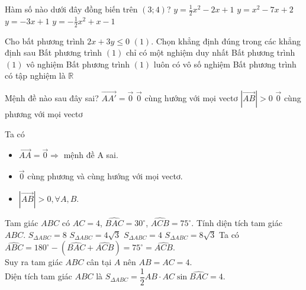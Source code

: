 \begin{ex}%
Hàm số nào dưới đây đồng biến trên $(3; 4)$?
\choice
{\True $y=\frac{1}{2} x^2-2 x+1$}
{$y=x^2-7 x+2$}
{$y=-3 x+1$}
{$y=-\frac{1}{2} x^2+x-1$}
\end{ex}

\begin{ex}%
Cho bất phương trình $2x+3y \le 0$ $(1)$. Chọn khẳng định đúng trong các khẳng định sau
\choice
{Bất phương trình $(1)$ chỉ có một nghiệm duy nhất}
{Bất phương trình $(1)$ vô nghiệm}
{\True Bất phương trình $(1)$ luôn có vô số nghiệm}
{Bất phương trình  có tập nghiệm là $\mathbb{R}$}
\end{ex}

\begin{ex}%
Mệnh đề nào sau đây sai?
\choice
{\True $\vec{AA'}=\vec{0}$}
{$\vec{0}$ cùng hướng với mọi vectơ}
{$\left| \vec{AB} \right|>0$}
{$\vec{0}$ cùng phương với mọi vectơ}
\loigiai
{Ta có
\begin{itemize}
\item $\vec{AA}=\vec{0}\Rightarrow$ mệnh đề A sai.
\item $\vec{0}$ cùng phương và cùng hướng với mọi vectơ.
\item $\left| \vec{AB} \right|>0,\forall A,B$.
\end{itemize}
}
\end{ex}

\begin{ex}%
Tam giác $ ABC$ có $ AC=4$, $\widehat{BAC}=30^\circ$, $\widehat{ACB}=75^\circ $. Tính diện tích tam giác $ ABC$.
\choice
{$ S_{\Delta ABC}=8$}
{$ S_{\Delta ABC}=4\sqrt{3}$}
{\True $ S_{\Delta ABC}=4$}
{$ S_{\Delta ABC}=8\sqrt{3}$}
\loigiai
{Ta có $ \widehat{ABC}=180^\circ-(\widehat{BAC}+\widehat{ACB} )=75^\circ =\widehat{ACB}$.\\
Suy ra tam giác $ ABC$ cân tại $ A$ nên $ AB=AC=4$.\\
Diện tích tam giác $ ABC$ là $ S_{\Delta ABC}=\dfrac{1}{2}AB\cdot AC\sin \widehat{BAC}=4$.}
\end{ex}


